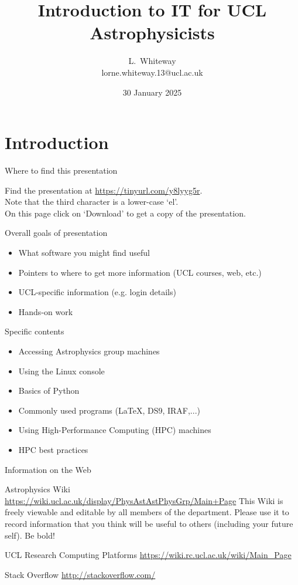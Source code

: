 \documentclass{beamer}
\title[IT Workshops] %
{Introduction to IT for UCL Astrophysicists}
\author{L.~Whiteway \\ lorne.whiteway.13@ucl.ac.uk}
\institute[UCL]
{
  Astrophysics Group\\
  Department of Physics and Astronomy\\
  University College London
}
\date
{30 January 2025}
\begin{document}
\frame{\titlepage}

\section{Introduction}

\begin{frame}{Where to find this presentation}
  \begin{block}{}
    Find the presentation at \alert{\url{https://tinyurl.com/y8lyyg5r}}.\\
    Note that the third character is a lower-case `el'. \\
    On this page click on `Download' to get a copy of the presentation.
  \end{block}
\end{frame}


\begin{frame}{Overall goals of presentation}
  \begin{itemize}
    \item What software you might find useful
    \item Pointers to where to get more information (UCL courses, web, etc.)
    \item UCL-specific information (e.g. login details)
    \item Hands-on work
  \end{itemize}
\end{frame}

\begin{frame}{Specific contents}
  \begin{itemize}
    \item Accessing Astrophysics group machines
    \item Using the Linux console
    \item Basics of Python
    \item Commonly used programs (LaTeX, DS9, IRAF,...)
    \item Using High-Performance Computing (HPC) machines
    \item HPC best practices
  \end{itemize}
\end{frame}

\begin{frame}{Information on the Web}
  \begin{block}{Astrophysics Wiki}
    \url{https://wiki.ucl.ac.uk/display/PhysAstAstPhysGrp/Main+Page}
    This Wiki is freely viewable and editable by all members of the department. Please use it to record information that you think will be useful to others (including your future self). Be bold!
  \end{block}

  \begin{block}{UCL Research Computing Platforms}
    \url{https://wiki.rc.ucl.ac.uk/wiki/Main_Page}
  \end{block}
  
  \begin{block}{Stack Overflow}
    \url{http://stackoverflow.com/}
  \end{block}
  
\end{frame}
\end{document}

